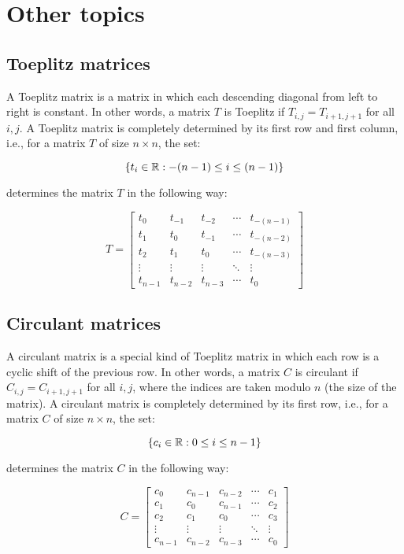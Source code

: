 \chapter{Other topics}

\section{Toeplitz matrices}

A Toeplitz matrix is a matrix in which each descending diagonal from left to right is constant. In other
words, a matrix $T$ is Toeplitz if $T_{i,j} = T_{i+1,j+1}$ for all $i,j$. A Toeplitz matrix is completely
determined by its first row and first column, i.e., for a matrix $T$ of size $n \times n$, the set:

$$\{t_i \in \mathbb{R}: -(n-1) \leq i \leq (n-1)\}$$

determines the matrix $T$ in the following way:

$$T = \begin{bmatrix}
t_0 & t_{-1} & t_{-2} & \cdots & t_{-(n-1)} \\
t_1 & t_0 & t_{-1} & \cdots & t_{-(n-2)} \\
t_2 & t_1 & t_0 & \cdots & t_{-(n-3)} \\
\vdots & \vdots & \vdots & \ddots & \vdots \\
t_{n-1} & t_{n-2} & t_{n-3} & \cdots & t_0
\end{bmatrix}$$

\section{Circulant matrices}

A circulant matrix is a special kind of Toeplitz matrix in which each row is a cyclic shift of the previous 
row. In other words, a matrix $C$ is circulant if $C_{i,j} = C_{i+1,j+1}$ for all $i,j$, where the indices 
are taken modulo $n$ (the size of the matrix). A circulant matrix is completely determined by its first row, 
i.e., for a matrix $C$ of size $n \times n$, the set:

$$\{c_i \in \mathbb{R}: 0 \leq i \leq n-1\}$$

determines the matrix $C$ in the following way:

$$C = \begin{bmatrix}
c_0 & c_{n-1} & c_{n-2} & \cdots & c_1 \\
c_1 & c_0 & c_{n-1} & \cdots & c_2 \\
c_2 & c_1 & c_0 & \cdots & c_3 \\
\vdots & \vdots & \vdots & \ddots & \vdots \\
c_{n-1} & c_{n-2} & c_{n-3} & \cdots & c_0
\end{bmatrix}$$


